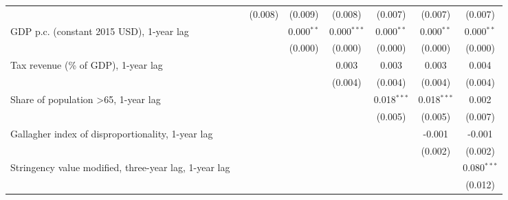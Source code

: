 \begin{table}[htbp]
\begin{tabular}{lccccccc}
                                                                                               &              & (0.008)       & (0.009)       & (0.008)       & (0.007)       & (0.007)       & (0.007)\\   
      GDP p.c. (constant 2015 USD), 1-year lag                                                 &              &               & 0.000$^{**}$  & 0.000$^{***}$ & 0.000$^{**}$  & 0.000$^{**}$  & 0.000$^{**}$\\   
                                                                                               &              &               & (0.000)       & (0.000)       & (0.000)       & (0.000)       & (0.000)\\   
      Tax revenue (\% of GDP), 1-year lag                                                      &              &               &               & 0.003         & 0.003         & 0.003         & 0.004\\   
                                                                                               &              &               &               & (0.004)       & (0.004)       & (0.004)       & (0.004)\\   
      Share of population >65, 1-year lag                                                      &              &               &               &               & 0.018$^{***}$ & 0.018$^{***}$ & 0.002\\   
                                                                                               &              &               &               &               & (0.005)       & (0.005)       & (0.007)\\   
      Gallagher index of disproportionality, 1-year lag                                        &              &               &               &               &               & -0.001        & -0.001\\   
                                                                                               &              &               &               &               &               & (0.002)       & (0.002)\\   
      Stringency value modified, three-year lag, 1-year lag                                    &              &               &               &               &               &               & 0.080$^{***}$\\   
                                                                                               &              &               &               &               &               &               & (0.012)\\   

\end{tabular}
\end{table}
